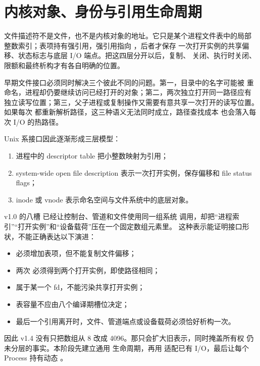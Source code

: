 \section{内核对象、身份与引用生命周期}

\begin{keyidea}
文件描述符不是文件，也不是内核对象的地址。它只是某个进程文件表中的局部
整数索引；表项持有强引用，强引用指向 ，后者才保存
一次打开实例的共享偏移、状态标志与底层 I/O 端点。把这四层分开以后，复制、
关闭、执行时关闭、限额和最终析构才有各自明确的位置。
\end{keyidea}

早期文件接口必须同时解决三个彼此不同的问题。第一，目录中的名字可能被
重命名，进程却仍要继续访问已经打开的对象；第二，两次独立打开同一路径应有
独立读写位置；第三，父子进程或复制操作又需要有意共享一次打开的读写位置。
如果每次  都重新解析路径，这三种语义无法同时成立，路径查找成本
也会落入每次 I/O 的热路径。

Unix 系接口因此逐渐形成三层模型：

\begin{enumerate}
  \item 进程中的 descriptor table 把小整数映射为引用；
  \item system-wide open file description 表示一次打开实例，保存偏移和
        file status flags；
  \item inode 或 vnode 表示命名空间与文件系统中的底层对象。
\end{enumerate}

v1.0 的八槽  已经让控制台、管道和文件使用同一组系统
调用，却把“进程索引”“打开实例”和“设备载荷”压在一个固定数组元素里。
这种表示能证明接口形状，不能正确表达以下演进：

\begin{itemize}
  \item {} 必须增加表项，但不能复制文件偏移；
  \item 两次  必须得到两个打开实例，即使路径相同；
  \item {} 属于某一个 fd，不能污染共享打开实例；
  \item 表容量不应由八个编译期槽位决定；
  \item 最后一个引用离开时，文件、管道端点或设备载荷必须恰好析构一次。
\end{itemize}

因此 v1.4 没有只把数组从 8 改成 4096。那只会扩大旧表示，同时掩盖所有权
仍未分层的事实。本阶段先建立通用  生命周期，再用
 适配已有 I/O，最后让每个 Process 持有动态
。

